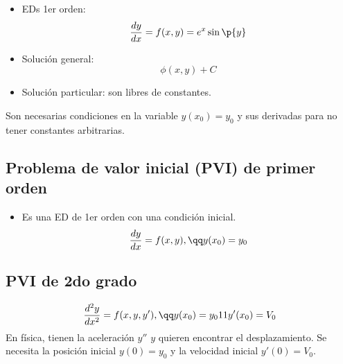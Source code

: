 \begin{itemize}
    \item EDs 1er orden:
        \[
          \frac{d y}{d x} = f(x,y) = e^x\sin\p{ y } 
        \]
    
    \item Solución general: 
        \[
          \phi(x,y)+C
        \]
    \item Solución particular: son libres de constantes.
\end{itemize}
Son necesarias condiciones en la variable $y(x_0)=y_0$  y sus derivadas para no tener constantes arbitrarias.

\subsection{Problema de valor inicial (PVI) de primer orden}
\begin{itemize}
    \item Es una ED de 1er orden con una condición inicial.
        \[
          \frac{d y}{d x} = f(x,y), \qq y(x_0) = y_0
        \]
\end{itemize} 

\subsection{PVI de 2do grado}
\[
  \frac{d ^2y}{d x^2} = f(x,y,y'), \qq y(x_0)=y_0 11 y'(x_0)=V_0
\]
En física, tienen la aceleración $y''$ $y$ quieren encontrar el desplazamiento. Se necesita la posición inicial $y(0)=y_0$ y la velocidad inicial $y'(0)=V_0$.

